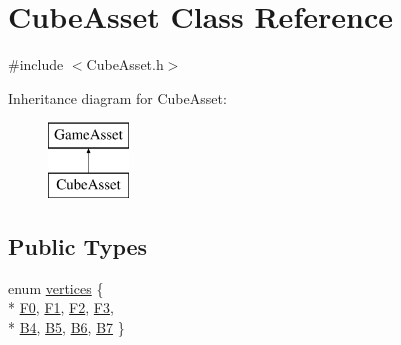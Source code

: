 \hypertarget{classCubeAsset}{\section{Cube\-Asset Class Reference}
\label{classCubeAsset}
}


{\ttfamily \#include $<$Cube\-Asset.\-h$>$}

Inheritance diagram for Cube\-Asset\-:\begin{figure}[H]
\begin{center}
\leavevmode
\includegraphics[height=2.000000cm]{classCubeAsset}
\end{center}
\end{figure}
\subsection*{Public Types}
\begin{DoxyCompactItemize}
\item 
enum \hyperlink{classCubeAsset_a26b74931626bfd5877b97363bc0f4404}{vertices} \{ \\*
\hyperlink{classCubeAsset_a26b74931626bfd5877b97363bc0f4404ade8c144c8d334f8f19dce1f1d86f1b4d}{F0}, 
\hyperlink{classCubeAsset_a26b74931626bfd5877b97363bc0f4404a3b9d40699743f0e6043ae3981cdd10b0}{F1}, 
\hyperlink{classCubeAsset_a26b74931626bfd5877b97363bc0f4404a0a7b167f1f8b61902492356eb4852871}{F2}, 
\hyperlink{classCubeAsset_a26b74931626bfd5877b97363bc0f4404a255c0425fbbb033a974a4e6f13678225}{F3}, 
\\*
\hyperlink{classCubeAsset_a26b74931626bfd5877b97363bc0f4404a949b2d4313c2eda31244798e23db7823}{B4}, 
\hyperlink{classCubeAsset_a26b74931626bfd5877b97363bc0f4404a1730ea3a776c19694b4e13208591197a}{B5}, 
\hyperlink{classCubeAsset_a26b74931626bfd5877b97363bc0f4404a3a4204130a8697e0f9df4223cec9b898}{B6}, 
\hyperlink{classCubeAsset_a26b74931626bfd5877b97363bc0f4404ab417aa4f7ad0b19b47a12e546c607e15}{B7}
 \}
\end{DoxyCompactItemize}
